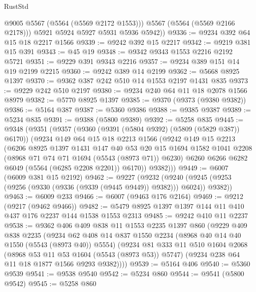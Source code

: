 \begin{lexlean}{RustStd}
\begin{coremodule}
            @9005
            @5567
            (@5564 (@5569 @2172 @1553)))
          @5567
          (@5564 (@5569 @2166 @2178)))
        @5921
        @5924
        @5927
        @5931
        @5936
        @5942))
@9336 := @9234 @392 @64 @15 @18 @2217 @1566
@9339 := @9242 @392 @15 @2217
@9342 := @9219 @381 @15 @391
@9343 := @45 @19
@9348 := @9342 @9343 @1553 @2216 @2192 @5721
@9351 := @9229 @391 @9343 @2216
@9357 := @9234 @389 @151 @14 @19 @2199 @2215
@9360 := @9242 @389 @14 @2199
@9362 := @5668 @8925 @1397
@9370 := @9362 @387 @242 @510 @14 @1553 @2197 @1431 @835
@9373 := @9229 @242 @510 @2197
@9380 := @9234 @240 @64 @11 @18 @2078 @1566 @8979
@9382 := @5770 @8925 @1397
@9385 := @9370 (@9373 (@9380 @9382))
@9386 := @5164 @387
@9387 := @5360 @9386
@9388 := @9385 @9387
@9389 := @5234 @835
@9391 := @9388 (@5800 @9389)
@9392 := @5258 @835
@9445 := @9348
    (@9351
      (@9357
        (@9360 (@9391 (@5804 @9392) (@5809 (@5829 @387)) @6170))
        (@9234
          @149
          @64
          @15
          @18
          @2213
          @1566
          (@9242
            @149
            @15
            @2213
            (@6206
              @8925
              @1397
              @1431
              @147
              @40
              @53
              @20
              @15
              @1694
              @1582
              @1041
              @2208
              (@8968 @71 @74 @71 @1694 (@5543 (@8973 @71)) @6230)
              @6260
              @6266
              @6282
              @6049
              (@5564 (@6285 @2208 @2201))
              @6170))
          @9382)))
@9449 := @6007 (@6009 @381 @15 @2192)
@9462 := @9227
    (@9232 (@9240 (@9245 (@9253 (@9256 (@9330 (@9336 (@9339 (@9445 @9449)) @9382))) @6024)) @9382))
@9463 := @6009 @233
@9466 := @6007 (@9463 @176 @2164)
@9469 := @9212 (@9217 (@9462 @9466))
@9482 := @5479 @8925 @1397 @1397 @144 @11 @410 @437 @176 @2237 @144 @1538 @1553 @2313
@9485 := @9242 @410 @11 @2237
@9538 := @9362
    @406
    @409
    @838
    @11
    @1553
    @2235
    @1397
    @860
    (@9229
      @409
      @838
      @2235
      (@9234
        @62
        @408
        @14
        @837
        @1550
        @2234
        (@8968 @40 @14 @40 @1550 (@5543 (@8973 @40)) @5554)
        (@9234
          @81
          @333
          @11
          @510
          @1604
          @2068
          (@8968 @53 @11 @53 @1604 (@5543 (@8973 @53)) @5747)
          (@9234 @238 @64 @11 @18 @1877 @1566 @9293 @9382))))
@9539 := @5164 @406
@9540 := @5360 @9539
@9541 := @9538 @9540
@9542 := @5234 @860
@9544 := @9541 (@5800 @9542)
@9545 := @5258 @860

\end{coremodule}
\end{lexlean}

